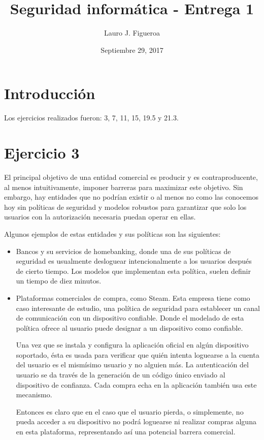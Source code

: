 \documentclass[12pt]{article}%
\begin{document}
\title{Seguridad informática - Entrega 1}
\author{Lauro J. Figueroa}
\date{Septiembre 29, 2017}
\maketitle
\section*{Introducción}
Los ejercicios realizados fueron: 3, 7, 11, 15, 19.5 y 21.3.

\section*{Ejercicio 3}
El principal objetivo de una entidad comercial es producir y es
contraproducente, al menos intuitivamente, imponer barreras para
maximizar este objetivo. Sin embargo, hay entidades que no podrían
existir o al menos no como las conocemos hoy sin políticas de seguridad y
modelos robustos para garantizar que solo los usuarios con la
autorización necesaria puedan operar en ellas.

Algunos ejemplos de estas entidades y sus políticas son las siguientes:
\begin{itemize}
\item Bancos y su servicios de homebanking, donde una de sus políticas
  de seguridad es usualmente desloguear intencionalmente a los usuarios
  después de cierto tiempo. Los modelos que implementan esta
  política, suelen definir un tiempo de diez minutos.
  
\item Plataformas comerciales de compra, como Steam. Esta empresa
  tiene como caso interesante de estudio, una política de seguridad
  para establecer un canal de comunicación con un dispositivo
  confiable. Donde el modelado de esta política ofrece al usuario
  puede designar a un dispositivo como confiable.

  Una vez que se instala y configura la aplicación oficial en algún
  dispositivo soportado, ésta es usada para verificar que quién
  intenta loguearse a la cuenta del usuario es el mismísimo usuario y
  no alguien más. La autenticación del usuario se da través de la
  generación de un código único enviado al dispositivo de confianza.
  Cada compra echa en la aplicación también usa este mecanismo.

  Entonces es claro que en el caso que el usuario pierda, o
  simplemente, no pueda acceder a su dispositivo no podrá loguearse ni
  realizar compras alguna en esta plataforma, representando así una
  potencial barrera comercial.
\end{itemize}
\end{document}
